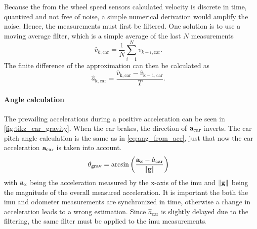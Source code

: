 Because the from the wheel speed sensors calculated velocity is discrete in time, quantized and not free of noise, a simple numerical derivation would amplify the noise.
Hence, the measurements must first be filtered.
One solution is to use a moving average filter, which is a simple average of the last $N$ measurements
\begin{equation}
	\hat{v}_{k, \mathrm{car}} = \frac{1}{N}\sum_{i=1}^N v_{k - i, \mathrm{car}}.
\end{equation}
The finite difference of the approximation can then be calculated as
\begin{equation}
	\label{eq:v_car_diff}
	\hat{a}_\mathrm{k, car} = \frac{\hat{v}_\mathrm{k, car} - \hat{v}_\mathrm{k - 1, car}}{T}.
\end{equation}

\paragraph{Angle calculation}\mbox{}\par
The prevailing accelerations during a positive acceleration can be seen in \cref{fig:tikz_car_gravity}.
When the car brakes, the direction of $\vb{a}_\mathrm{car}$ inverts.
The car pitch angle calculation is the same as in \cref{eq:ang_from_acc}, just that now the car acceleration $\vb{a}_\mathrm{car}$ is taken into account.
\begin{equation}
	\label{eq:ang_from_acc_gravity}
	\theta_\mathrm{grav}  = \arcsin\left(\frac{\vb{a}_\mathrm{x} - \hat{a}_\mathrm{car}}{\norm{\vb{g}}}\right)
\end{equation}
with $\vb{a}_\mathrm{x}$ being the acceleration measured by the x-axis of the \gls{imu} and $\norm{\vb{g}}$ being the magnitude of the overall measured acceleration.
It is important the both the \gls{imu} and odometer measurements are synchronized in time, otherwise a change in acceleration leads to a wrong estimation.
Since $\hat{a}_\mathrm{car}$ is slightly delayed due to the filtering, the same filter must be applied to the \gls{imu} measurements.


